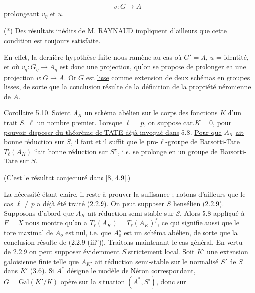 \begin{equation*}
v : G \longrightarrow A
\end{equation*}
\underline{prolongeant} $v_\eta$ \underline{et} $u$.

(*) Des résultats inédits de M. RAYNAUD impliquent d'ailleurs que cette condition est toujours satisfaite.



En effet, la dernière hypothèse faite nous ramène au cas où $G'=A$, $u$ = identité, et où $v_\eta : G_\eta \longrightarrow A_\eta$ est donc une projection, qu'on se propose de prolonger en une projection $v: G \longrightarrow A$. Or $G$ est \underline{lisse} comme extension de deux schémas en groupes lisses, de sorte que la conclusion résulte de la définition de la propriété néronienne de $A$.

\underline{Corollaire} 5.10. \underline{Soient} $A_K$ \underline{un schéma abélien sur le corps des fonctions} $K$ \underline{d'un trait} $S$, $\ell$ \underline{un nombre premier.} \underline{Lorsque} $\ell = p$, \underline{on suppose} car.$K = 0$, \underline{pour pouvoir disposer du théorème de TATE déjà invoqué dans} 5.8. \underline{Pour que} $A_K$ \underline{ait bonne réduction sur} $S$, \underline{il faut et il suffit que le pro-$\ell$-groupe de Barsotti-Tate} $T_\ell(A_K)$ ``\underline{ait bonne réduction sur} $S$'', \underline{i.e.} \underline{se prolonge en un groupe de Barsotti-Tate sur} $S$.

(C'est le résultat conjecturé dans [8, 4.9].)

La nécessité étant claire, il reste à prouver la suffisance ; notons d'ailleurs que le cas $\ell \neq p$ a déjà été traité (2.2.9). On peut supposer $S$ hensélien (2.2.9). Supposons d'abord que $A_K$ ait réduction semi-stable sur $S$. Alors 5.8 appliqué à $F = X$ nous montre qu'on a $T_\ell(A_K) = T_\ell(A_K)^f$, ce qui signifie aussi que le tore maximal de $A_o$ est nul, i.e. que $A_o^o$ est un schéma abélien, de sorte que la conclusion résulte de (2.2.9 (iii${}^o$)). Traitons maintenant le cas général. En vertu de 2.2.9 on peut supposer évidemment $S$ strictement local. Soit $K'$ une extension galoisienne finie telle que $A_{K'}$ ait réduction semi-stable sur le normalisé $S'$ de $S$ dans $K'$ (3.6). Si $A^*$ désigne le modèle de Néron correspondant, $G = \mathrm{Gal}(K'/K)$ opère sur la situation $(A^*,S')$, donc sur



